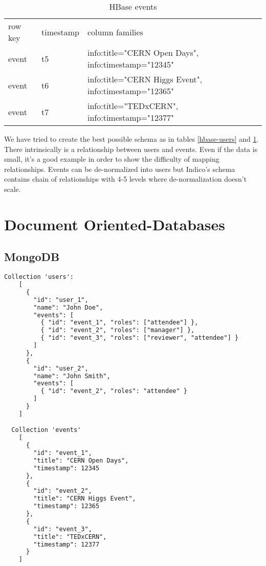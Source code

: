 \begin{table}[H]
  \centering
  \caption{HBase events}
  \renewcommand{\arraystretch}{1.5}
  \begin{tabular}{| >{\centering}m{0.6in} | >{\centering}m{0.8in} | >{\centering\arraybackslash}m{3.9in} |}
	\hline
    \multicolumn{3}{|c|}{\textbf{events}}
    \\ \hline
    row key & timestamp & column families
    \\ \hline
    event\textunderscore 1 & t5 & info:title="CERN Open Days", info:timestamp="12345"
    \\ \hline
    event\textunderscore 2 & t6 & info:title="CERN Higgs Event", info:timestamp="12365"
    \\ \hline
    event\textunderscore 3 & t7 & info:title="TEDxCERN", info:timestamp="12377"
    \\ \hline
  \end{tabular}
  \label{hbase-events}
\end{table}

We have tried to create the best possible schema as in tables \ref{hbase-users} and \ref{hbase-events}. There intrinsically is a relationship between users and events. Even if the data is small, it's a good example in order to show the difficulty of mapping relationships. Events can be de-normalized into users but Indico's schema contains chain of relationships with 4-5 levels where de-normalization doesn't scale.

\section{Document Oriented-Databases}

\subsection{MongoDB}

\begin{lstlisting}[language=HTML, caption=Example Dashboard in MongoDB]
  Collection 'users':
    [
      {
        "id": "user_1",
        "name": "John Doe",
        "events": [
          { "id": "event_1", "roles": ["attendee"] },
          { "id": "event_2", "roles": ["manager"] },
          { "id": "event_3", "roles": ["reviewer", "attendee"] }
        ]
      },
      {
        "id": "user_2",
        "name": "John Smith",
        "events": [
          { "id": "event_2", "roles": "attendee" }
        ]
      }
    ]

  Collection 'events'
    [
      {
        "id": "event_1",
        "title": "CERN Open Days",
        "timestamp": 12345
      },
      {
        "id": "event_2",
        "title": "CERN Higgs Event",
        "timestamp": 12365
      },
      {
        "id": "event_3",
        "title": "TEDxCERN",
        "timestamp": 12377
      }
    ]
\end{lstlisting}

